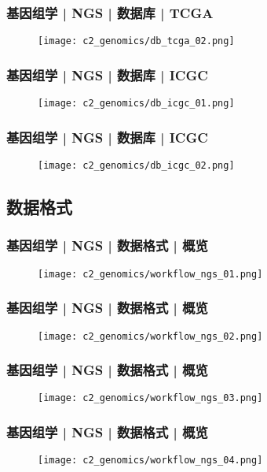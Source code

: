 \begin{frame}
  \frametitle{基因组学 | NGS | 数据库 | TCGA}
  \begin{figure}
    \centering
    \texttt{[image: c2\_genomics/db\_tcga\_02.png]}
  \end{figure}
\end{frame}

\begin{frame}
  \frametitle{基因组学 | NGS | 数据库 | ICGC}
  \begin{figure}
    \centering
    \texttt{[image: c2\_genomics/db\_icgc\_01.png]}
  \end{figure}
\end{frame}
    
\begin{frame}
  \frametitle{基因组学 | NGS | 数据库 | ICGC}
  \begin{figure}
    \centering
    \texttt{[image: c2\_genomics/db\_icgc\_02.png]}
  \end{figure}
\end{frame}
    
\subsection{数据格式}
\begin{frame}
  \frametitle{基因组学 | NGS | 数据格式 | 概览}
  \begin{figure}
    \centering
    \texttt{[image: c2\_genomics/workflow\_ngs\_01.png]}
  \end{figure}
\end{frame}
    
\begin{frame}
  \frametitle{基因组学 | NGS | 数据格式 | 概览}
  \begin{figure}
    \centering
    \texttt{[image: c2\_genomics/workflow\_ngs\_02.png]}
  \end{figure}
\end{frame}
    
\begin{frame}
  \frametitle{基因组学 | NGS | 数据格式 | 概览}
  \begin{figure}
    \centering
    \texttt{[image: c2\_genomics/workflow\_ngs\_03.png]}
  \end{figure}
\end{frame}
    
\begin{frame}
  \frametitle{基因组学 | NGS | 数据格式 | 概览}
  \begin{figure}
    \centering
    \texttt{[image: c2\_genomics/workflow\_ngs\_04.png]}
  \end{figure}
\end{frame}

